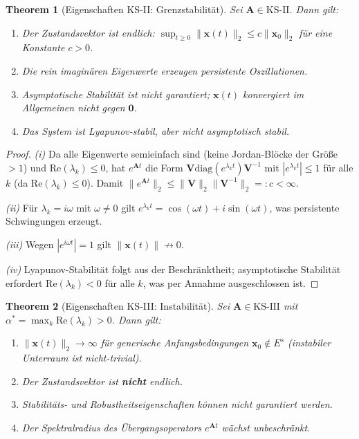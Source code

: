 \documentclass[a4paper, 12pt, twoside, openright]{report}
\newtheorem{theorem}{Theorem}[section]
\theoremstyle{definition}
\theoremstyle{definition}
\newcommand{\vx}{\bm{x}}
\newcommand{\vA}{\bm{A}}
\newcommand{\vV}{\bm{V}}
\newcommand{\re}{\mathrm{Re}}
\newcommand{\diag}{\mathrm{diag}}
\newcommand{\KS}{\mathrm{KS}}
\begin{document}
\begin{theorem}[Eigenschaften KS-II: Grenzstabilität]
\label{thm:ks2}
Sei $\vA \in \KS\text{-II}$. Dann gilt:
\begin{enumerate}[label=(\roman*)]
  \item Der Zustandsvektor ist endlich: $\sup_{t\geq 0}\|\vx(t)\|_2 \leq c\|\vx_0\|_2$
    für eine Konstante $c > 0$.
  \item Die rein imaginären Eigenwerte erzeugen persistente Oszillationen.
  \item Asymptotische Stabilität ist nicht garantiert; $\vx(t)$ konvergiert im
    Allgemeinen nicht gegen $\bm{0}$.
  \item Das System ist Lyapunov-stabil, aber nicht asymptotisch stabil.
\end{enumerate}
\end{theorem}

\begin{proof}
\textit{(i)} Da alle Eigenwerte semieinfach sind (keine Jordan-Blöcke der Größe $> 1$)
und $\re(\lambda_k) \leq 0$, hat $e^{\vA t}$ die Form $\vV\diag(e^{\lambda_k t})\vV^{-1}$
mit $|e^{\lambda_k t}| \leq 1$ für alle $k$ (da $\re(\lambda_k) \leq 0$). Damit
$\|e^{\vA t}\|_2 \leq \|\vV\|_2\|\vV^{-1}\|_2 =: c < \infty$.

\textit{(ii)} Für $\lambda_k = i\omega$ mit $\omega \neq 0$ gilt
$e^{\lambda_k t} = \cos(\omega t) + i\sin(\omega t)$, was persistente Schwingungen erzeugt.

\textit{(iii)} Wegen $|e^{i\omega t}| = 1$ gilt $\|\vx(t)\| \not\to 0$.

\textit{(iv)} Lyapunov-Stabilität folgt aus der Beschränktheit; asymptotische Stabilität
erfordert $\re(\lambda_k) < 0$ für alle $k$, was per Annahme ausgeschlossen ist. \qedhere
\end{proof}

\begin{theorem}[Eigenschaften KS-III: Instabilität]
\label{thm:ks3}
Sei $\vA \in \KS\text{-III}$ mit $\alpha^* = \max_k\re(\lambda_k) > 0$. Dann gilt:
\begin{enumerate}[label=(\roman*)]
  \item $\|\vx(t)\|_2 \to \infty$ für generische Anfangsbedingungen
    $\vx_0 \notin E^s$ (instabiler Unterraum ist nicht-trivial).
  \item Der Zustandsvektor ist \textbf{nicht} endlich.
  \item Stabilitäts- und Robustheitseigenschaften können nicht garantiert werden.
  \item Der Spektralradius des Übergangsoperators $e^{\vA t}$ wächst unbeschränkt.
\end{enumerate}
\end{theorem}
\end{document}
